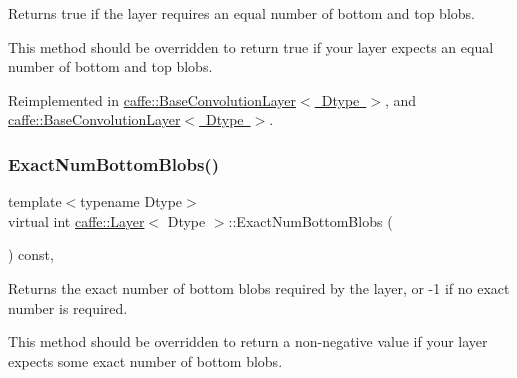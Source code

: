 Returns true if the layer requires an equal number of bottom and top blobs. 

This method should be overridden to return true if your layer expects an equal number of bottom and top blobs. 

Reimplemented in \mbox{\hyperlink{classcaffe_1_1_base_convolution_layer_ad8e839460bf52abe3df2008b99a1810d}{caffe\+::\+Base\+Convolution\+Layer$<$ Dtype $>$}}, and \mbox{\hyperlink{classcaffe_1_1_base_convolution_layer_ad8e839460bf52abe3df2008b99a1810d}{caffe\+::\+Base\+Convolution\+Layer$<$ Dtype $>$}}.

\mbox{\label{classcaffe_1_1_layer_a8e5ee0494d85f5f55fc4396537cbc60f}} 
\subsubsection{\texorpdfstring{Exact\+Num\+Bottom\+Blobs()}{ExactNumBottomBlobs()}\hspace{0.1cm}{\footnotesize\ttfamily [1/2]}}
{\footnotesize\ttfamily template$<$typename Dtype$>$ \\
virtual int \mbox{\hyperlink{classcaffe_1_1_layer}{caffe\+::\+Layer}}$<$ Dtype $>$\+::Exact\+Num\+Bottom\+Blobs (\begin{DoxyParamCaption}{ }\end{DoxyParamCaption}) const\hspace{0.3cm}{\ttfamily [inline]}, {\ttfamily [virtual]}}



Returns the exact number of bottom blobs required by the layer, or -\/1 if no exact number is required. 

This method should be overridden to return a non-\/negative value if your layer expects some exact number of bottom blobs. 

